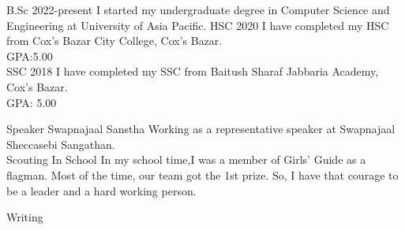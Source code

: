 \documentclass[11pt]{spidercv}
\begin{document}
    





    \begin{MainPart}
    
    \Experience
        {\ColorHighlight}
		{B.Sc}
		{}
        {2022-present}
        {   
          I started my undergraduate degree in Computer Science and Engineering at University of Asia Pacific.          
        }
    \Experience
        {\ColorHighlight}
		{HSC}
		{}
        {2020}
        {   
            I have completed my HSC from Cox's Bazar City College, Cox's Bazar.\\
            GPA:5.00\\
        }
    \Experience
        {\ColorHighlight}
		{SSC}
		{}
        {2018}
        {   
            I have completed my SSC from Baitush Sharaf Jabbaria Academy, Cox's Bazar.\\
           GPA: 5.00\\
        }

\vspace*{1cm}




    \Experience
        {\ColorHighlight}
		{Speaker}
		{Swapnajaal Sanstha}
        {}
        {   
            Working as a representative speaker at Swapnajaal Sheccasebi Sangathan.\\
    
        }
    \Experience
        {\ColorHighlight}
		{Scouting}
		{In School}
        {}
        {   
            In my school time,I was a member of Girls' Guide as a flagman. Most of the time, our team got the 1st prize. So, I have that courage to be a leader and a hard working person.\\
            
        }

        \Experience
        {\ColorHighlight}
		{Writing}
		

\end{MainPart}
\end{document}
